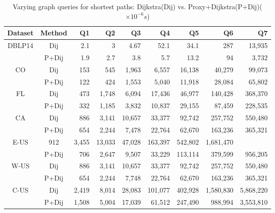 \begin{table}[t!]
\label{tab:performance_path_queries_dj}
\caption{Varying graph queries for shortest paths: Dijkstra(Dij) vs. Proxy+Dijkstra(P+Dij)($\times 10^{-6}s$)}
\vspace{-1ex}
\begin{center}
\begin{tabular}{|c|c|r|r|r|r|r|r|r|}
\hline

Dataset & Method & Q1 & Q2 & Q3 & Q4 & Q5 & Q6 &Q7  \\ \hline \hline
\multirow{2}{*}{DBLP14} & Dij & 2.1 & 3 & 4.67 & 52.1 & 34.1 & 287 & 13,935 \\ \cline{2-9}
                      & P+Dij & 1.9 & 2.7 & 3.8 & 5.7 & 13.2 & 94 & 3,732 \\ \hline
\multirow{2}{*}{CO}  & Dij & 153 & 545 & 1,963 & 6,557 & 16,138 & 40,279 & 99,073 \\ \cline{2-9}
                  & P+Dij  & 122 & 424 & 1,553 & 5,040 & 11,918 & 28,084 & 65,802 \\ \hline
\multirow{2}{*}{FL}  & Dij & 473 & 1,748 & 6,094 & 17,436 & 46,977 & 140,428 & 368,370 \\ \cline{2-9}
                   & P+Dij & 332 & 1,185 & 3,832 & 10,837 & 29,155 & 87,459 & 228,535 \\ \hline
\multirow{2}{*}{CA}  & Dij & 886 & 3,141 & 10,657 & 33,377 & 92,742 & 257,752 & 550,480 \\ \cline{2-9}
                   & P+Dij & 654 & 2,244 & 7,478 & 22,764 & 62,670 & 163,236 & 365,321 \\ \hline
\multirow{2}{*}{E-US} & 912 & 3,455 & 13,033 & 47,028 & 163,397 & 542,802 & 1,681,470 \\ \cline{2-9}
                   & P+Dij & 706 & 2,647 & 9,507 & 33,229 & 113,114 & 379,599 & 956,205 \\ \hline
\multirow{2}{*}{W-US} & Dij & 886 & 3,141 & 10,657 & 33,377 & 92,742 & 257,752 & 550,480 \\ \cline{2-9}
                   & P+Dij & 654 & 2,244 & 7,748 & 22,764 & 62,670 & 163,236 & 365,321 \\ \hline
\multirow{2}{*}{C-US} & Dij & 2,419 & 8,014 & 28,083 & 101,077 & 402,928 & 1,580,830 & 5,868,220 \\ \cline{2-9}
                   & P+Dij & 1,508 & 5,004 & 17,039 & 61,512 & 247,490 & 988,994 & 3,553,810 \\ \hline
\end{tabular}
\end{center}
\end{table}

